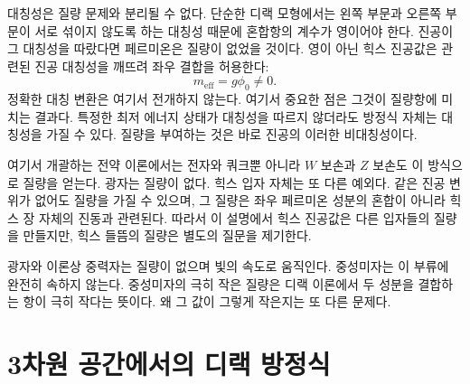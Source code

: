 \begin{classroomqa}
\end{classroomqa}

대칭성은 질량 문제와 분리될 수 없다. 단순한 디랙 모형에서는 왼쪽 부문과 오른쪽 부문이 서로 섞이지 않도록 하는 대칭성 때문에 혼합항의 계수가 영이어야 한다. 진공이 그 대칭성을 따랐다면 페르미온은 질량이 없었을 것이다. 영이 아닌 힉스 진공값은 관련된 진공 대칭성을 깨뜨려 좌우 결합을 허용한다:
\begin{equation}
m_{\mathrm{eff}}=g\phi_0\neq0.
\end{equation}
정확한 대칭 변환은 여기서 전개하지 않는다. 여기서 중요한 점은 그것이 질량항에 미치는 결과다. 특정한 최저 에너지 상태가 대칭성을 따르지 않더라도 방정식 자체는 대칭성을 가질 수 있다. 질량을 부여하는 것은 바로 진공의 이러한 비대칭성이다.

여기서 개괄하는 전약 이론에서는 전자와 쿼크뿐 아니라 \(W\) 보손과 \(Z\) 보손도 이 방식으로 질량을 얻는다. 광자는 질량이 없다. 힉스 입자 자체는 또 다른 예외다. 같은 진공 변위가 없어도 질량을 가질 수 있으며, 그 질량은 좌우 페르미온 성분의 혼합이 아니라 힉스 장 자체의 진동과 관련된다. 따라서 이 설명에서 힉스 진공값은 다른 입자들의 질량을 만들지만, 힉스 들뜸의 질량은 별도의 질문을 제기한다.

\begin{classroomqa}
\end{classroomqa}

광자와 이론상 중력자는 질량이 없으며 빛의 속도로 움직인다. 중성미자는 이 부류에 완전히 속하지 않는다. 중성미자의 극히 작은 질량은 디랙 이론에서 두 성분을 결합하는 항이 극히 작다는 뜻이다. 왜 그 값이 그렇게 작은지는 또 다른 문제다.

\section{3차원 공간에서의 디랙 방정식}

